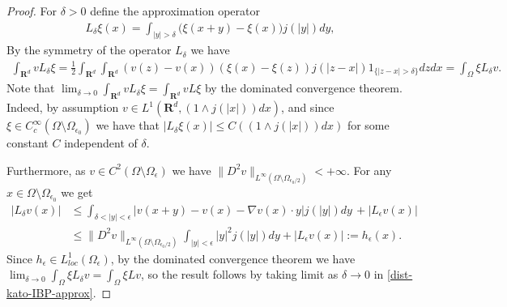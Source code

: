 \documentclass[a4paper,12pt,draft]{article}
\theoremstyle{plain}
\theoremstyle{definition}
\numberwithin{equation}{section}
\newcommand{\rd}{\mathbf{R}^d}
\renewcommand{\leq}{\leqslant}
\newcommand{\1}{1}
\begin{document}
\begin{proof}
For $\delta>0$ define the approximation operator 
\begin{align*}
    L_{\delta}\xi (x) = \int_{|y|>\delta} \big(\xi(x+y) -\xi(x)\big) j(|y|) dy, 
\end{align*}
By the symmetry of the operator $L_{\delta}$ we have 
\begin{align}\label{dist-kato-IBP-approx}
    \int_{\rd} v L_{\delta}\xi = \frac 1 2\int_{\rd}\int_{\rd}(v(z)-v(x))(\xi(x)-\xi(z))j(|z-x|)1_{\{|z-x|>\delta\}}dz dx=\int_{\Omega} \xi L_{\delta} v . 
\end{align}
Note that $\lim_{\delta\rightarrow 0} \int_{\rd} v L_{\delta}\xi = \int_{\rd} v L\xi$ by the dominated convergence theorem. Indeed, by assumption $v\in L^1(\rd, (1\wedge j(|x|))dx)$, and since $\xi \in C^{\infty}_c(\Omega\setminus\Omega_{\epsilon_0})$ we have that $|L_{\delta} \xi(x)|\leq C((1\wedge j(|x|))dx)$ for some constant $C$ independent of $\delta$. 

Furthermore, as $v\in C^2(\Omega\setminus\Omega_{\epsilon})$ we have $\|D^2 v\|_{L^{\infty}(\Omega\setminus\Omega_{\epsilon_0/2})}<+\infty$. For any $x\in \Omega\setminus\Omega_{\epsilon_0}$ we get
\begin{align*}
     |L_{\delta} v(x)|&\leq \int_{\delta< |y|<\epsilon} \big|v(x+y) -v(x)-\nabla v(x)\cdot y\big| j(|y|) dy \, + \big|L_{\epsilon} v(x) \big|\\ 
    & \leq \|D^2 v\|_{L^{\infty}(\Omega\setminus\Omega_{\epsilon_0/2})} \int_{|y|<\epsilon} |y|^2 j(|y|) dy + |L_{\epsilon} v(x)| := h_\epsilon(x).  
\end{align*}
Since $h_\epsilon \in L^1_{loc}(\Omega_\epsilon)$, by the dominated convergence theorem we have $\lim_{\delta\rightarrow 0} \int_{\Omega} \xi L_{\delta} v = \int_{\Omega} \xi L v$, so the result follows by taking limit as $\delta \rightarrow 0$ in \eqref{dist-kato-IBP-approx}.
\end{proof}
\end{document}
